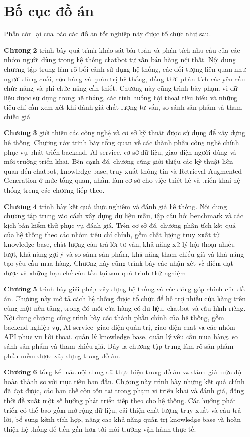 \documentclass[../DoAn.tex]{subfiles}
\begin{document}
\section{Bố cục đồ án}
\label{section:1.4}
Phần còn lại của báo cáo đồ án tốt nghiệp này được tổ chức như sau.

\textbf{Chương 2} trình bày quá trình khảo sát bài toán và phân tích nhu cầu của các nhóm người dùng trong hệ thống chatbot tư vấn bán hàng nội thất. Nội dung chương tập trung làm rõ bối cảnh sử dụng hệ thống, các đối tượng liên quan như người dùng cuối, cửa hàng và quản trị hệ thống, đồng thời phân tích các yêu cầu chức năng và phi chức năng cần thiết. Chương này cũng trình bày phạm vi dữ liệu được sử dụng trong hệ thống, các tình huống hội thoại tiêu biểu và những tiêu chí cần xem xét khi đánh giá chất lượng tư vấn, so sánh sản phẩm và tham chiếu giá.

\textbf{Chương 3} giới thiệu các công nghệ và cơ sở kỹ thuật được sử dụng để xây dựng hệ thống. Chương này trình bày tổng quan về các thành phần công nghệ chính phục vụ phát triển backend, AI service, cơ sở dữ liệu, giao diện người dùng và môi trường triển khai. Bên cạnh đó, chương cũng giới thiệu các kỹ thuật liên quan đến chatbot, knowledge base, truy xuất thông tin và Retrieval-Augmented Generation ở mức tổng quan, nhằm làm cơ sở cho việc thiết kế và triển khai hệ thống trong các chương tiếp theo.

\textbf{Chương 4} trình bày kết quả thực nghiệm và đánh giá hệ thống. Nội dung chương tập trung vào cách xây dựng dữ liệu mẫu, tập câu hỏi benchmark và các kịch bản kiểm thử phục vụ đánh giá. Trên cơ sở đó, chương phân tích kết quả của hệ thống theo các nhóm tiêu chí chính, gồm chất lượng truy xuất từ knowledge base, chất lượng câu trả lời tư vấn, khả năng xử lý hội thoại nhiều lượt, khả năng gợi ý và so sánh sản phẩm, khả năng tham chiếu giá và khả năng tạo yêu cầu mua hàng. Chương này cũng trình bày các nhận xét về điểm đạt được và những hạn chế còn tồn tại sau quá trình thử nghiệm.

\textbf{Chương 5} trình bày giải pháp xây dựng hệ thống và các đóng góp chính của đồ án. Chương này mô tả cách hệ thống được tổ chức để hỗ trợ nhiều cửa hàng trên cùng một nền tảng, trong đó mỗi cửa hàng có dữ liệu, chatbot và cấu hình riêng. Nội dung chương cũng trình bày các thành phần chính của hệ thống, gồm backend nghiệp vụ, AI service, giao diện quản trị, giao diện chat và các nhóm API phục vụ hội thoại, quản lý knowledge base, quản lý yêu cầu mua hàng, so sánh sản phẩm và tham chiếu giá. Đây là chương tập trung làm rõ sản phẩm phần mềm được xây dựng trong đồ án.

\textbf{Chương 6} tổng kết các nội dung đã thực hiện trong đồ án và đánh giá mức độ hoàn thành so với mục tiêu ban đầu. Chương này trình bày những kết quả chính đã đạt được, các hạn chế còn tồn tại trong phạm vi triển khai và đánh giá, đồng thời đề xuất một số hướng phát triển tiếp theo cho hệ thống. Các hướng phát triển có thể bao gồm mở rộng dữ liệu, cải thiện chất lượng truy xuất và câu trả lời, bổ sung kênh tích hợp, nâng cao khả năng quản trị knowledge base và hoàn thiện hệ thống để tiến gần hơn tới môi trường vận hành thực tế.
\end{document}
